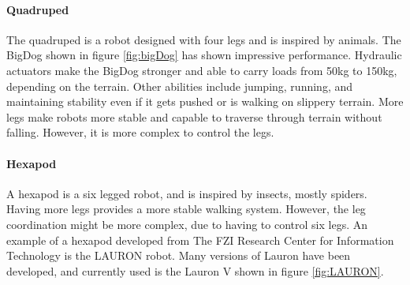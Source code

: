 \documentclass[USenglish]{ifimaster}  %
\begin{document}
\paragraph{Quadruped}
The quadruped is a robot designed with four legs and is inspired by animals. The BigDog \cite{Raibert200810822} shown in figure \ref{fig:bigDog} has shown impressive performance. Hydraulic actuators make the BigDog stronger and able to carry loads from 50kg to 150kg, depending on the terrain. Other abilities include  jumping, running, and maintaining  stability even if it gets pushed or is walking on slippery terrain. More legs make robots more stable and capable to traverse through terrain without falling. However, it is more complex to control the legs.

\paragraph{Hexapod}
A hexapod is a six legged robot, and is inspired by insects, mostly spiders. Having more legs provides a more stable walking system. However, the leg coordination might be more complex, due to having to control six legs. An example of a hexapod developed from The FZI Research Center for Information Technology is the LAURON robot. Many versions of Lauron have been developed, and currently used is the Lauron V shown in figure \ref{fig:LAURON}.
\end{document}
